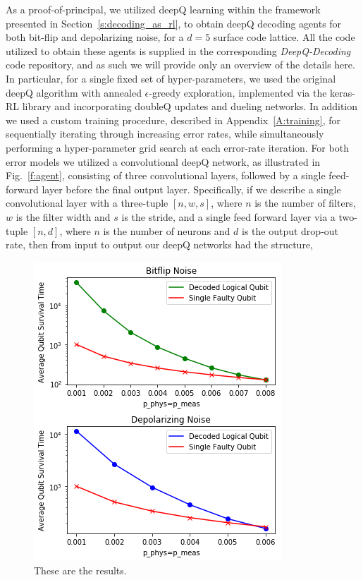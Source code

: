 \documentclass[twocolumn,preprintnumbers,amsmath,amssymb,notitlepage,nofootinbib,longbibliography,superscriptaddress,aps,pra,10pt]{revtex4-1}
\begin{document}
	As a proof-of-principal, we utilized deepQ learning within the framework presented in Section~\ref{s:decoding_as_rl}, to obtain deepQ decoding agents for both bit-flip and depolarizing noise, for a $d=5$ surface code lattice.
	All the code utilized to obtain these agents is supplied in the corresponding \textit{DeepQ-Decoding} code repository, and as such we will provide only an overview of the details here.
	In particular, for a single fixed set of hyper-parameters, we used the original deepQ algorithm with annealed $\epsilon$-greedy exploration, implemented via the keras-RL library and incorporating doubleQ updates and dueling networks.
	In addition we used a custom training procedure, described in Appendix~\ref{A:training}, for sequentially iterating through increasing error rates, while simultaneously performing a hyper-parameter grid search at each error-rate iteration.
	For both error models we utilized a convolutional deepQ network, as illustrated in Fig.~\ref{f:agent}, consisting of three convolutional layers, followed by a single feed-forward layer before the final output layer.
	Specifically, if we describe a single convolutional layer with a three-tuple $[n,w,s]$, where $n$ is the number of filters, $w$ is the filter width and $s$ is the stride, and a single feed forward layer via a two-tuple $[n,d]$, where $n$ is the number of neurons and $d$ is the output drop-out rate, then from input to output our deepQ networks had the structure,

	\begin{figure}
		\centering
		\includegraphics[width=0.8\linewidth]{figures/results.png}
		\caption{
			These are the results.
		}
		\label{f:results}
	\end{figure}
\end{document}
